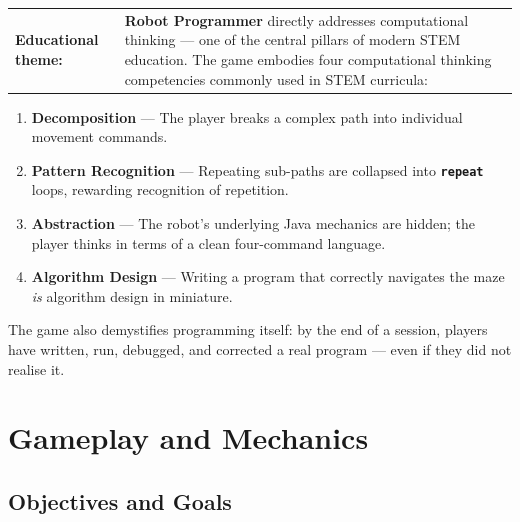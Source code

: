 \documentclass[12pt,a4paper]{article}
\newcommand{\keyword}[1]{\textcolor{keyword}{\texttt{\bfseries #1}}}
\newcommand{\gddfield}[2]{%
  \noindent\begin{tabularx}{\linewidth}{>{\bfseries\color{accent}\sffamily}p{3.5cm} X}
    #1 & #2
  \end{tabularx}\smallskip}
\begin{document}
\vspace{6pt}

\begin{tcolorbox}[gddbox, title={Theme}]
\gddfield{Educational theme:}{%
\textbf{Robot Programmer} directly addresses computational thinking — one of the central pillars of modern STEM education. The game embodies four computational thinking competencies commonly used in STEM curricula:
}

\vspace{4pt}
\begin{enumerate}[leftmargin=2em, label=\textbf{\arabic*.}]
  \item \textbf{Decomposition} — The player breaks a complex path into individual movement commands.
  \item \textbf{Pattern Recognition} — Repeating sub-paths are collapsed into \keyword{repeat} loops, rewarding recognition of repetition.
  \item \textbf{Abstraction} — The robot's underlying Java mechanics are hidden; the player thinks in terms of a clean four-command language.
  \item \textbf{Algorithm Design} — Writing a program that correctly navigates the maze \emph{is} algorithm design in miniature.
\end{enumerate}

\vspace{4pt}
The game also demystifies programming itself: by the end of a session, players have written, run, debugged, and corrected a real program — even if they did not realise it.
\end{tcolorbox}

\section{Gameplay and Mechanics}

\subsection{Objectives and Goals}
\end{document}
